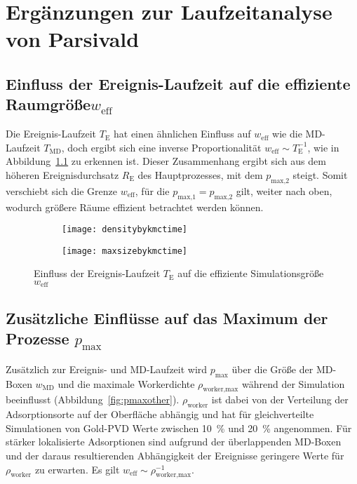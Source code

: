 \chapter{Ergänzungen zur Laufzeitanalyse von Parsivald}
\label{appendix_runtime}

\section{Einfluss der Ereignis-Laufzeit auf die effiziente Raumgröße\texorpdfstring{$w_\text{eff}$}{weff}}

Die Ereignis-Laufzeit $T_\text{E}$ hat einen ähnlichen Einfluss auf $w_\text{eff}$ wie die MD-Laufzeit $T_\text{MD}$, doch ergibt sich eine inverse Proportionalität $w_\text{eff} \sim T_\text{E}^{-1}$, wie in Abbildung~\ref{fig:weffeventtime} zu erkennen ist.
Dieser Zusammenhang ergibt sich aus dem höheren Ereignisdurchsatz $R_\text{E}$ des Hauptprozesses, mit dem $p_\text{max,2}$ steigt.
Somit verschiebt sich die Grenze $w_\text{eff}$, für die $p_\text{max,1} = p_\text{max,2}$ gilt, weiter nach oben, wodurch größere Räume effizient betrachtet werden können.

\begin{figure}[p]

  \captionsetup[subfigure]{singlelinecheck=false}
  \def\subfigwidth{7cm}
  \begin{subfigure}[t]{\subfigwidth}
    \texttt{[image: densitybykmctime]}
  \end{subfigure}
  \hfill
  \begin{subfigure}[t]{\subfigwidth}
    \texttt{[image: maxsizebykmctime]}
  \end{subfigure}

  \caption{Einfluss der Ereignis-Laufzeit $T_\text{E}$ auf die effiziente Simulationsgröße $w_\text{eff}$}
  \label{fig:weffeventtime}

\end{figure}

\section{Zusätzliche Einflüsse auf das Maximum der Prozesse \texorpdfstring{$p_\text{max}$}{pmax}}

Zusätzlich zur Ereignis- und MD-Laufzeit wird $p_\text{max}$ über die Größe der MD-Boxen $w_\text{MD}$ und die maximale Workerdichte $\rho_\text{worker,max}$ während der Simulation beeinflusst (Abbildung~\ref{fig:pmaxother}).
$\rho_\text{worker}$ ist dabei von der Verteilung der Adsorptionsorte auf der Oberfläche abhängig und hat für gleichverteilte Simulationen von Gold-PVD Werte zwischen \SI{10}{\percent} und \SI{20}{\percent} angenommen.
Für stärker lokalisierte Adsorptionen sind aufgrund der überlappenden MD-Boxen und der daraus resultierenden Abhängigkeit der Ereignisse geringere Werte für $\rho_\text{worker}$ zu erwarten.
Es gilt $w_\text{eff} \sim \rho_\text{worker,max}^{-1}$.

